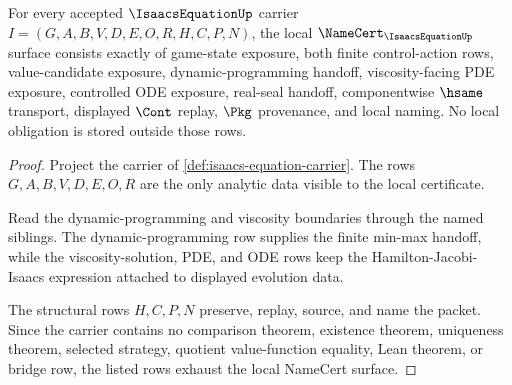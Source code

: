 \begin{theorem}
\label{thm:isaacs-equation-namecert-obligations}
For every accepted $\IsaacsEquationUp$ carrier $I=(G,A,B,V,D,E,O,R,H,C,P,N)$, the local $\NameCert_{\IsaacsEquationUp}$ surface consists exactly of game-state exposure, both finite control-action rows, value-candidate exposure, dynamic-programming handoff, viscosity-facing PDE exposure, controlled ODE exposure, real-seal handoff, componentwise $\hsame$ transport, displayed $\Cont$ replay, $\Pkg$ provenance, and local naming. No local obligation is stored outside those rows.
\end{theorem}
\begin{proof}
Project the carrier of \autoref{def:isaacs-equation-carrier}. The rows $G,A,B,V,D,E,O,R$ are the only analytic data visible to the local certificate.

Read the dynamic-programming and viscosity boundaries through the named siblings. The dynamic-programming row supplies the finite min-max handoff, while the viscosity-solution, PDE, and ODE rows keep the Hamilton-Jacobi-Isaacs expression attached to displayed evolution data.

The structural rows $H,C,P,N$ preserve, replay, source, and name the packet. Since the carrier contains no comparison theorem, existence theorem, uniqueness theorem, selected strategy, quotient value-function equality, Lean theorem, or bridge row, the listed rows exhaust the local NameCert surface.
\end{proof}

